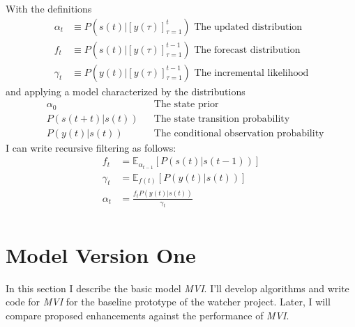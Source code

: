 \documentclass[12pt]{article}
\newcommand{\field}[1]{\mathbb{#1}}
\newcommand{\EV}[2]{\field{E}_{#1}\left[#2\right]}
\newcommand{\os}[4]{{\left[ #1(#2) \right]}_{#3}^{#4}} %
\newcommand{\ti}[2]{{#1}{(#2)}}                         %
\newcommand{\ts}[4]{\os{#1}{#2}{#2=#3}{#4}} %
\begin{document}
With the definitions
\begin{align}
  \label{def:alpha}
  \alpha_t &\equiv P(\ti{s}{t}|\ts{y}{\tau}{1}{t}) \text{ The updated distribution} \\
  f_t &\equiv P(\ti{s}{t}|\ts{y}{\tau}{1}{t-1}) \text{ The forecast
    distribution} \\
  \gamma_t &\equiv P(\ti{y}{t}|\ts{y}{\tau}{1}{t-1}) \text{ The
    incremental likelihood}
\end{align}
and applying a model characterized by the distributions
\begin{align}
  \label{def:alpha0}
  &\alpha_0  &&\text{The state prior} \\
  &P(\ti{s}{t+t}|\ti{s}{t}) &&\text{The state transition probability} \\
  &P(\ti{y}{t}|\ti{s}{t}) &&\text{The conditional observation probability}
\end{align}
I can write recursive filtering as follows:
\begin{align}
  f_t &= \EV{\alpha_{t-1}} {P(\ti{s}{t}|\ti{s}{t-1})} \\
  \gamma_t &= \EV{\ti{f}{t}} {P(\ti{y}{t}|\ti{s}{t})} \\
  \alpha_t &= \frac{f_t P(\ti{y}{t}|\ti{s}{t})}{\gamma_t} \\
\end{align}

\section{Model Version One}
\label{sec:model1}

In this section I describe the basic model \emph{MVI}.  I'll develop
algorithms and write code for \emph{MVI} for the baseline prototype of
the watcher project.  Later, I will compare proposed enhancements
against the performance of \emph{MVI}.
\end{document}
